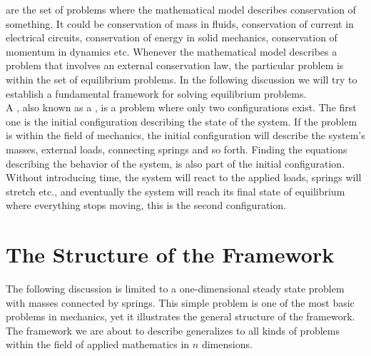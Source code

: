 
\label{sec:framework_for_equilibrium_problems}
 are the set of problems
where the mathematical model describes conservation of something. It could be
conservation of mass in fluids, conservation of current in electrical
circuits, conservation of energy in solid mechanics, conservation of
momentum in dynamics etc. Whenever the mathematical model describes a problem
that involves an external conservation law, %
the particular problem is within the set of
equilibrium problems. In the following discussion we will try to
establish a fundamental framework for solving equilibrium problems.\\

 
A , also known as a , is a problem where only
two configurations exist.  
The first one is the initial configuration describing the state of the
system. If the problem is within the field of mechanics, the initial
configuration will describe the system's masses, external loads, connecting springs and
so forth. Finding the equations describing the behavior of the
system, is also part of the initial configuration.
Without introducing time, the system will react to the applied loads,
springs will stretch etc., and eventually the system will reach its final
state of equilibrium where everything stops moving, this is the second configuration. \\


\section{The Structure of the Framework}
The following discussion is limited to a one-dimensional steady state
problem with masses connected by springs. This simple problem is one of the most
basic problems in mechanics, yet it illustrates the general
structure of the framework. The framework we are about to describe
generalizes to all kinds of problems within the field of applied mathematics in
$n$ dimensions. \\ 

